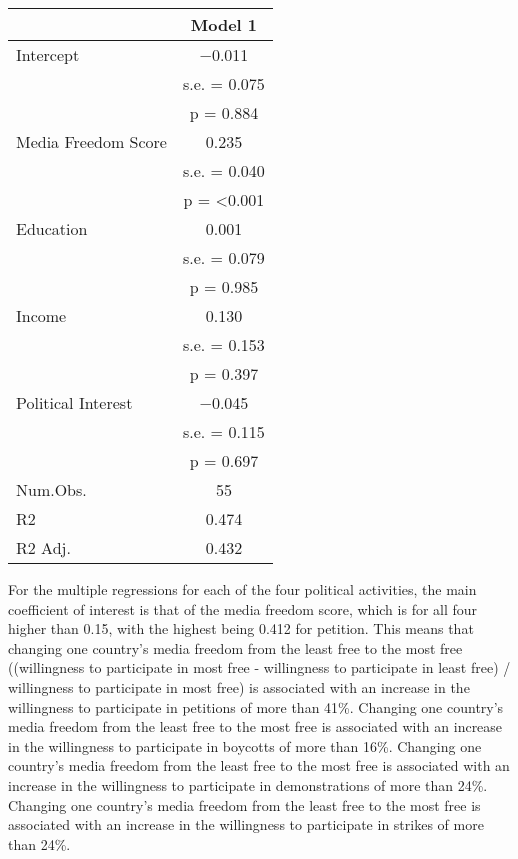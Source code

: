 \documentclass[
]{article}
\begin{document}
\begin{table}
\centering
\begin{tabular}[t]{lc}
\toprule
  & Model 1\\
\midrule
Intercept & \num{-0.011}\\
 & s.e. = \num{0.075}\\
 & p = \num{0.884}\\
Media Freedom Score & \num{0.235}\\
 & s.e. = \num{0.040}\\
 & p = \num{<0.001}\\
Education & \num{0.001}\\
 & s.e. = \num{0.079}\\
 & p = \num{0.985}\\
Income & \num{0.130}\\
 & s.e. = \num{0.153}\\
 & p = \num{0.397}\\
Political Interest & \num{-0.045}\\
 & s.e. = \num{0.115}\\
 & p = \num{0.697}\\
\midrule
Num.Obs. & \num{55}\\
R2 & \num{0.474}\\
R2 Adj. & \num{0.432}\\
\bottomrule
\end{tabular}
\end{table}

For the multiple regressions for each of the four political activities,
the main coefficient of interest is that of the media freedom score,
which is for all four higher than 0.15, with the highest being 0.412 for
petition. This means that changing one country's media freedom from the
least free to the most free ((willingness to participate in most free -
willingness to participate in least free) / willingness to participate
in most free) is associated with an increase in the willingness to
participate in petitions of more than 41\%. Changing one country's media
freedom from the least free to the most free is associated with an
increase in the willingness to participate in boycotts of more than
16\%. Changing one country's media freedom from the least free to the
most free is associated with an increase in the willingness to
participate in demonstrations of more than 24\%. Changing one country's
media freedom from the least free to the most free is associated with an
increase in the willingness to participate in strikes of more than 24\%.
\end{document}

